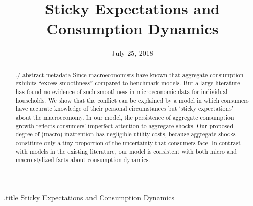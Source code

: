 \documentclass[titlepage]{\econtex}\newcommand{\texname}{cAndCwithStickyE}
\begin{document}




\begin{verbatimwrite}{\jobname.title}
Sticky Expectations and Consumption Dynamics
\end{verbatimwrite}

\hfill{\tiny \jobname}

\title{Sticky Expectations and \\ Consumption Dynamics}




\date{July 25, 2018}
\maketitle

\begin{abstract}
  \begin{verbatimwrite}{./\jobname-abstract.metadata}
    Since \cite{cdSmooth} macroeconomists have known that aggregate consumption exhibits ``excess smoothness'' compared to benchmark models.  But a large literature has found no evidence of such smoothness in microeconomic data for individual households.  We show that the conflict can be explained by a model in which consumers have accurate knowledge of their personal circumstances but `sticky expectations' about the macroeconomy. In our model, the persistence of aggregate consumption growth reflects consumers' imperfect attention to aggregate shocks. Our proposed degree of (macro) inattention has negligible utility costs, because aggregate shocks constitute only a tiny proportion of the uncertainty that consumers face.  In contrast with models in the existing literature, our model is consistent with both micro and macro stylized facts about consumption dynamics.
  \end{verbatimwrite}
  
\end{abstract}
\end{document}
